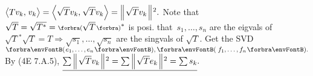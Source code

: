 
$\big\langle{}Tv_k,\;\!v_k{}\big\rangle=\Big\langle{}\sqrt{T}v_k,\:\!\sqrt{T}v_k{}\Big\rangle=\Big\Vert\hspace{1pt}{}\sqrt{T}v_k{}\hspace{1pt}\Big\Vert{\hspace{0.5pt}}{^2}.$ Note that $\sqrt{T}=\sqrt{T^*}=\BigPar{\!\!\:\sqrt{T}}{^*}$ is posi.\parSol{}
\NOTICE that \,$s_1,\dots,s_n$ are the eigvals of $\sqrt{T}{^*}\sqrt{T}=T\Longrightarrow\sqrt{s_1},\dots,\sqrt{s_n}$ are the singvals of $\sqrt{T}.$\vspace{1pt}\parSol{}
Get the SVD $\Par{e_1,\dots,e_n},\Par{\,f_1,\dots,f_n}.$ By (4E 7.A.5), $\uline{\sum\BigDvertsq{\sqrt{T}v_k}=\sum\BigDvertsq{\sqrt{T}e_k}=\sum s_k}.$\PfEnd
\SepLine


